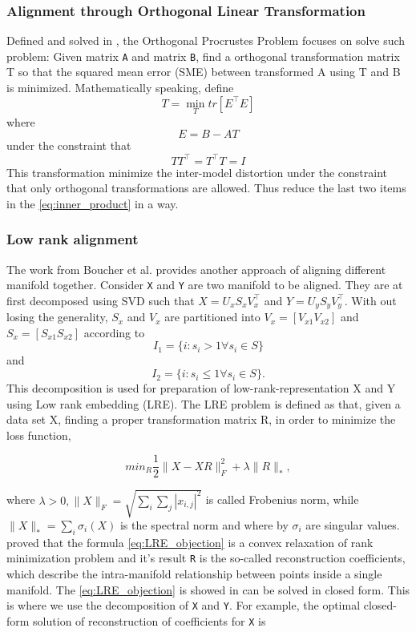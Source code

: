 \documentclass[11pt,a4paper]{article}
\begin{document}
  \subsubsection{Alignment through Orthogonal Linear Transformation}
  Defined and solved in \cite{schonemann1966generalized}, the Orthogonal Procrustes Problem focuses on solve such problem: Given matrix \verb|A| and matrix \verb|B|, find a orthogonal transformation matrix T so that the squared mean error (SME) between transformed A using T and B is minimized. Mathematically speaking, define
  \begin{equation}
  T = \min_{T}tr[E^\intercal E]
  \end{equation}
  where 
  \begin{equation}
  E=B-AT
  \end{equation}
  under the constraint that 
  \begin{equation}
  TT^\intercal=T^\intercal T=I
  \end{equation}
  This transformation minimize the inter-model distortion under the constraint that only orthogonal transformations are allowed. Thus reduce the last two items in the \eqref{eq:inner_product} in a way.

  \subsubsection{Low rank alignment}
  The work from Boucher et al. \cite{boucher2015aligning} provides another approach of aligning different manifold together. Consider \verb|X| and \verb|Y| are two manifold to be aligned. They are at first decomposed using SVD such that $X=U_xS_xV_x^\intercal$ and $Y=U_yS_yV_y^\intercal$. With out losing the generality, $S_x$ and $V_x$ are partitioned into $V_x=[V_{x1}V_{x2}]$ and $S_x=[S_{x1}S_{x2}]$ according to 
  $$
  I_1=\{i:s_i>1 \forall s_i \in S\}
  $$
  and
  $$
  I_2=\{i:s_i\leq 1 \forall s_i\in S\}.
  $$ 
  This decomposition is used for preparation of low-rank-representation X and Y using Low rank embedding (LRE). The LRE problem is defined as that, given a data set X, finding a proper transformation matrix R, in order to minimize the loss function,

  \begin{equation}\label{eq:LRE_objection}
  min_R\frac{1}{2}\|X-XR\|^2_F+\lambda\|R\|_*,
  \end{equation}

  where $\lambda > 0, \|X\|_F=\sqrt{\sum_i\sum_j|x_{i,j}|^2}$ is called Frobenius norm, while $\|X\|_*=\sum_i\sigma_i(X)$ is the spectral norm and where by $\sigma_i$ are singular values. \cite{candes2010power} proved that the formula \eqref{eq:LRE_objection} is a convex relaxation of rank minimization problem and it's result \verb|R| is the so-called reconstruction coefficients, which describe the intra-manifold relationship between points inside a single manifold. The \eqref{eq:LRE_objection} is showed in \cite{favaro2011closed} can be solved in closed form. This is where we use the decomposition of \verb|X| and \verb|Y|. For example, the optimal closed-form solution of reconstruction of coefficients for \verb|X| is
  
\end{document}
